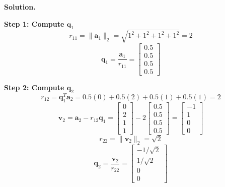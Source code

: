 \documentclass{article}
\newcommand{\0}{{\mathbf{0}}} %
\newcommand{\vect}[1]{\mathbf{#1}}
\begin{document}
\textbf{Solution.}

\textbf{Step 1: Compute $\vect{q}_1$}
\[
r_{11} = \|\mathbf{a}_1\|_2 = \sqrt{1^2 + 1^2 + 1^2 + 1^2} = 2
\]
\[
\mathbf{q}_1 = \frac{\mathbf{a}_1}{r_{11}} =
\begin{bmatrix} 0.5 \\ 0.5 \\ 0.5 \\ 0.5
\end{bmatrix}
\]

\textbf{Step 2: Compute $\mathbf{q}_2$}
\[
r_{12} = \mathbf{q}_1^T \mathbf{a}_2 = 0.5(0) + 0.5(2) + 0.5(1) + 0.5(1) = 2
\]
\[
\mathbf{v}_2 = \mathbf{a}_2 - r_{12}\mathbf{q}_1 =
\begin{bmatrix} 0 \\ 2 \\ 1 \\ 1
\end{bmatrix} - 2
\begin{bmatrix} 0.5 \\ 0.5 \\ 0.5 \\ 0.5
\end{bmatrix} =
\begin{bmatrix} -1 \\ 1 \\ 0 \\ 0
\end{bmatrix}
\]
\[
r_{22} = \|\mathbf{v}_2\|_2 = \sqrt{2}
\]
\[
\mathbf{q}_2 = \frac{\mathbf{v}_2}{r_{22}} =
\begin{bmatrix} -1/\sqrt{2} \\ 1/\sqrt{2} \\ 0 \\ 0
\end{bmatrix}
\]
\end{document}
